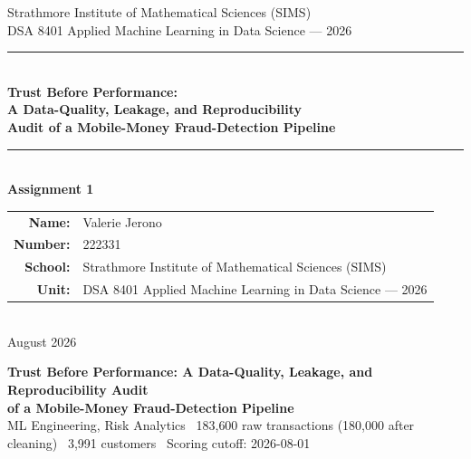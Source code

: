 \documentclass[10pt,a4paper]{article}
\begin{document}
\begin{titlepage}
\vspace*{4cm}
\begin{center}

  {\large Strathmore Institute of Mathematical Sciences (SIMS)}\\[0.3cm]
  {\normalsize DSA 8401 Applied Machine Learning in Data Science --- 2026}\\[3cm]

  \rule{\textwidth}{0.8pt}\\[0.6cm]

  {\LARGE\bfseries Trust Before Performance:\\[8pt]
    A Data-Quality, Leakage, and Reproducibility\\[8pt]
    Audit of a Mobile-Money Fraud-Detection Pipeline}\\[0.6cm]

  \rule{\textwidth}{0.8pt}\\[2.5cm]

  {\large\bfseries Assignment 1}\\[2.5cm]

  {\normalsize
    \begin{tabular}{rl}
      \textbf{Name:}   & Valerie Jerono \\[5pt]
      \textbf{Number:} & 222331 \\[5pt]
      \textbf{School:} & Strathmore Institute of Mathematical Sciences (SIMS) \\[5pt]
      \textbf{Unit:}   & DSA 8401 Applied Machine Learning in Data Science --- 2026 \\
    \end{tabular}
  }\\[3cm]

  {\small August 2026}

\end{center}
\vfill
\end{titlepage}

\begin{center}
  {\large\bfseries Trust Before Performance: A Data-Quality, Leakage,
    and Reproducibility Audit\\[2pt]
    of a Mobile-Money Fraud-Detection Pipeline}\\[3pt]
  {\small ML Engineering, Risk Analytics \textbullet\
   183{,}600 raw transactions (180{,}000 after cleaning) \textbullet\
   3{,}991 customers \textbullet\ Scoring cutoff: 2026-08-01}
\end{center}
\end{document}
